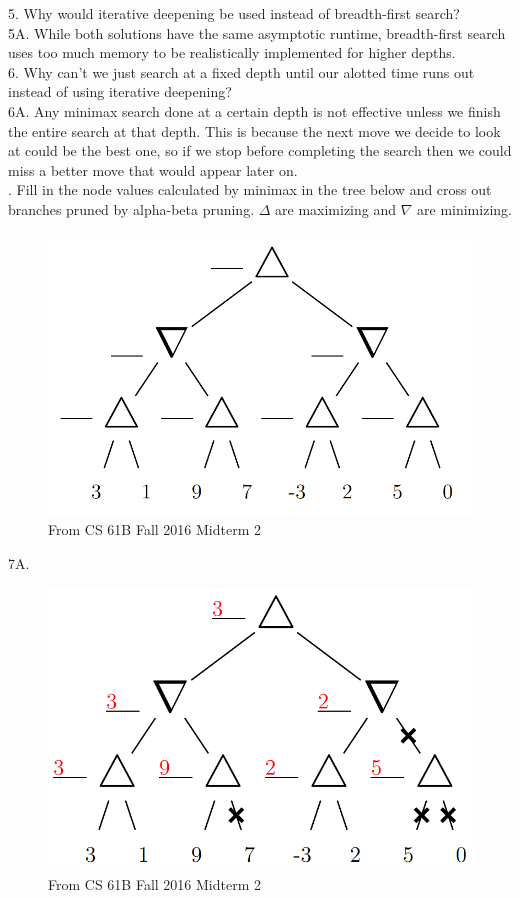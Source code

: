 \documentclass[12pt, letterpaper]{article}
\begin{document}
5. Why would iterative deepening be used instead of breadth-first search? \\
5A. While both solutions have the same asymptotic runtime, breadth-first search uses too much memory to be realistically implemented for higher depths. \\

6. Why can't we just search at a fixed depth until our alotted time runs out instead of using iterative deepening? \\
6A. Any minimax search done at a certain depth is not effective unless we finish the entire search at that depth. This is because the next move we decide to look at could be the best one, so if we stop before completing the search then we could miss a better move that would appear later on. \\
. Fill in the node values calculated by minimax in the tree below and cross out branches pruned by alpha-beta pruning. $\Delta$ are maximizing and $\nabla$ are minimizing.
\begin{figure}[H]
    \centering
    \includegraphics[scale=0.3]{minimax-prob.png}
    \caption*{From CS 61B Fall 2016 Midterm 2}
\end{figure}
7A.
\begin{figure}[H]
    \centering
    \includegraphics[scale=0.3]{minimax-sol.png}
    \caption*{From CS 61B Fall 2016 Midterm 2}
\end{figure} \\
\end{document}
